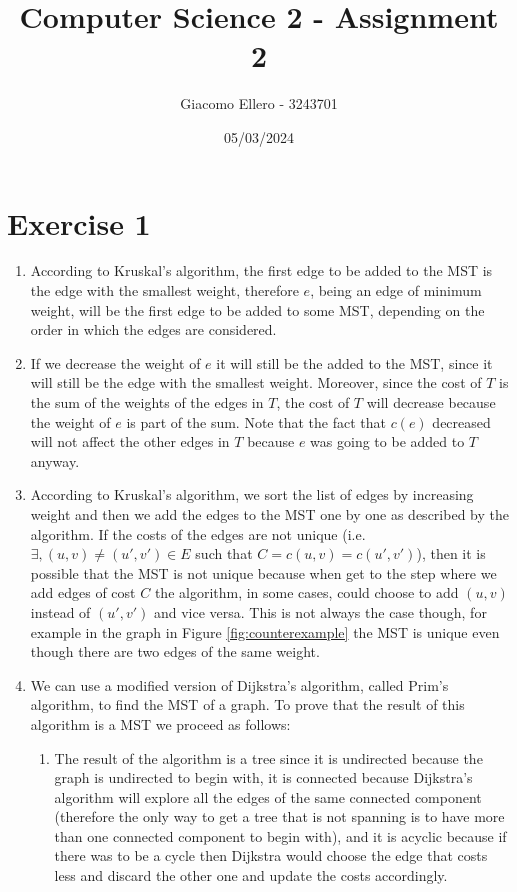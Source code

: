 \documentclass[10pt]{article}
\title{Computer Science 2 - Assignment 2}
\author{Giacomo Ellero - 3243701}
\date{05/03/2024}
\begin{document}
\maketitle

\section*{Exercise 1}

\begin{enumerate}
    \item According to Kruskal's algorithm, the first edge to be added to the MST is the edge with the smallest weight, therefore $e$, being an edge of minimum weight, will be the first edge to be added to some MST, depending on the order in which the edges are considered.
    \item If we decrease the weight of $e$ it will still be the added to the MST, since it will still be the edge with the smallest weight. Moreover, since the cost of $T$ is the sum of the weights of the edges in $T$, the cost of $T$ will decrease because the weight of $e$ is part of the sum. Note that the fact that $c(e)$ decreased will not affect the other edges in $T$ because $e$ was going to be added to $T$ anyway.
    \item According to Kruskal's algorithm, we sort the list of edges by increasing weight and then we add the edges to the MST one by one as described by the algorithm. If the costs of the edges are not unique (i.e. $\exists, (u, v) \neq (u', v') \in E$ such that $C = c(u, v) = c(u', v')$), then it is possible that the MST is not unique because when get to the step where we add edges of cost $C$ the algorithm, in some cases, could choose to add $(u, v)$ instead of $(u', v')$ and vice versa. This is not always the case though, for example in the graph in Figure \ref{fig:counterexample} the MST is unique even though there are two edges of the same weight.
    \item We can use a modified version of Dijkstra's algorithm, called Prim's algorithm, to find the MST of a graph. To prove that the result of this algorithm is a MST we proceed as follows:
          \begin{enumerate}[label=\roman*)]
              \item
                    The result of the algorithm is a tree since it is undirected because the graph is undirected to begin with, it is connected because Dijkstra's algorithm will explore all the edges of the same connected component (therefore the only way to get a tree that is not spanning is to have more than one connected component to begin with), and it is acyclic because if there was to be a cycle then Dijkstra would choose the edge that costs less and discard the other one and update the costs accordingly.

\end{enumerate}
\end{enumerate}
\end{document}

